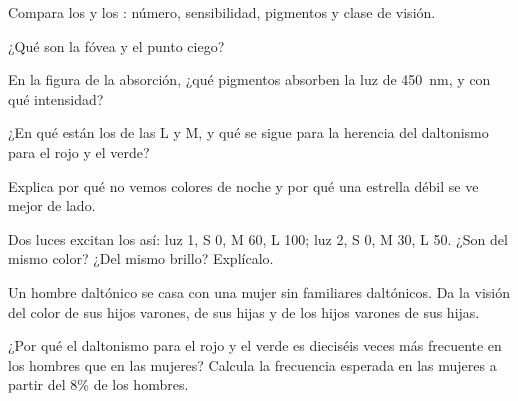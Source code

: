 \begin{exercise}[$\star$]\label{exo:g11:the-eye:2}
Compara los  y los : número, sensibilidad, pigmentos y
clase de visión.
\end{exercise}

\begin{exercise}[$\star$]\label{exo:g11:the-eye:3}
¿Qué son la fóvea y el punto ciego?
\end{exercise}

\begin{exercise}[$\star$]\label{exo:g11:the-eye:4}
En la figura de la absorción, ¿qué pigmentos absorben la luz de
\qty{450}{nm}, y con qué intensidad?
\end{exercise}

\begin{exercise}[$\star$]\label{exo:g11:the-eye:5}
¿En qué  están los  de las  L y M, y qué se sigue
para la herencia del daltonismo para el rojo y el verde?
\end{exercise}

\begin{exercise}[$\star\star$]\label{exo:g11:the-eye:6}
Explica por qué no vemos colores de noche y por qué una estrella débil
se ve mejor de lado.
\end{exercise}

\begin{exercise}[$\star\star$]\label{exo:g11:the-eye:7}
Dos luces excitan los  así: luz 1, S 0, M 60, L 100; luz 2, S 0,
M 30, L 50. ¿Son del mismo color? ¿Del mismo brillo? Explícalo.
\end{exercise}

\begin{exercise}[$\star\star$]\label{exo:g11:the-eye:8}
Un hombre daltónico se casa con una mujer sin familiares daltónicos.
Da la visión del color de sus hijos varones, de sus hijas y de los
hijos varones de sus hijas.
\end{exercise}

\begin{exercise}[$\star\star$]\label{exo:g11:the-eye:9}
¿Por qué el daltonismo para el rojo y el verde es dieciséis veces más
frecuente en los hombres que en las mujeres? Calcula la frecuencia
esperada en las mujeres a partir del 8\% de los hombres.
\end{exercise}

